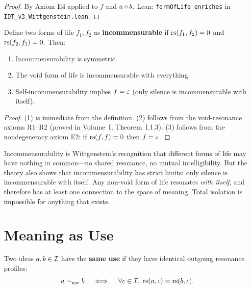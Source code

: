 \begin{proof}
By Axiom E4 applied to $f$ and $a \circ b$.
Lean: \texttt{formOfLife\_enriches} in \texttt{IDT\_v3\_Wittgenstein.lean}.
\end{proof}

\begin{theorem}
\label{thm:incommensurable}
Define two forms of life $f_1, f_2$ as \textbf{incommensurable} if
$\mathrm{rs}(f_1, f_2) = 0$ and $\mathrm{rs}(f_2, f_1) = 0$. Then:
\begin{enumerate}
\item Incommensurability is symmetric.
\item The void form of life is incommensurable with everything.
\item Self-incommensurability implies $f = \varepsilon$ (only silence is
incommensurable with itself).
\end{enumerate}
\end{theorem}

\begin{proof}
(1) is immediate from the definition. (2) follows from the void-resonance
axioms R1--R2 (proved in Volume~I, Theorem~I.1.3). (3) follows from the
nondegeneracy axiom E2: if $\mathrm{rs}(f,f) = 0$ then $f = \varepsilon$.
\end{proof}

\begin{interpretation}
Incommensurability is Wittgenstein's recognition that different forms of life
may have nothing in common---no shared resonance, no mutual intelligibility.
But the theory also shows that incommensurability has strict limits: only
silence is incommensurable with itself. Any non-void form of life resonates
\emph{with itself}, and therefore has at least one connection to the space
of meaning. Total isolation is impossible for anything that exists.
\end{interpretation}

\section{Meaning as Use}

\begin{definition}
\label{def:same-use}
Two ideas $a, b \in \mathcal{I}$ have the \textbf{same use} if they have identical
outgoing resonance profiles:
\[
a \sim_{\mathrm{use}} b \quad \iff \quad \forall c \in \mathcal{I},\; \mathrm{rs}(a, c) = \mathrm{rs}(b, c).
\]
\end{definition}

